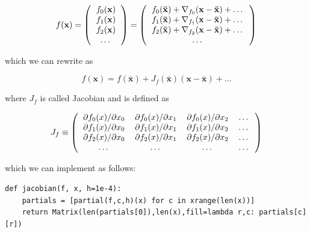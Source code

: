 \documentclass[justified,sixbynine]{tufte-book}
\def\ft{\small\tt}
\theoremstyle{plain}%
\theoremstyle{definition}
\theoremstyle{remark}
\begin{document}
\begin{fullwidth}
\begin{equation}
f(\mathbf{x}) =
\left(
\begin{tabular}{c}
$f_0(\mathbf{x})$ \\
$f_1(\mathbf{x})$ \\
$f_2(\mathbf{x})$ \\
\dots
\end{tabular}
\right) =
\left(
\begin{tabular}{c}
$f_0(\mathbf{\bar x}) + \nabla_{f_0}(\mathbf{x}-\mathbf{\bar x}) + \dots$ \\
$f_1(\mathbf{\bar x}) + \nabla_{f_1}(\mathbf{x}-\mathbf{\bar x}) + \dots$ \\
$f_2(\mathbf{\bar x}) + \nabla_{f_2}(\mathbf{x}-\mathbf{\bar x}) + \dots$ \\
\dots
\end{tabular}
\right)
\end{equation}

which we can rewrite as

\begin{equation}
f(\mathbf{x}) = f(\mathbf{\bar x}) + J_f(\mathbf{\bar x})(\mathbf{x}-\mathbf{\bar x}) + \dots \label{jacobian2}
\end{equation}

where $J_f$ is called Jacobian and is defined as

\begin{equation}
J_f \equiv
\left(
\begin{tabular}{cccc}
$\partial f_0(x)/\partial x_0$ &
$\partial f_0(x)/\partial x_1$ &
$\partial f_0(x)/\partial x_2$ &
\dots \\
$\partial f_1(x)/\partial x_0$ &
$\partial f_1(x)/\partial x_1$ &
$\partial f_1(x)/\partial x_2$ &
\dots \\
$\partial f_2(x)/\partial x_0$ &
$\partial f_2(x)/\partial x_1$ &
$\partial f_2(x)/\partial x_2$ &
\dots \\
\dots & \dots & \dots &\dots 
\end{tabular}
\right)
\end{equation}

which we can implement as follows:

\begin{lstlisting}[caption={in file: {\ft nlib.py}}]
def jacobian(f, x, h=1e-4):
    partials = [partial(f,c,h)(x) for c in xrange(len(x))]
    return Matrix(len(partials[0]),len(x),fill=lambda r,c: partials[c][r])
\end{lstlisting}


\end{fullwidth}
\end{document}
